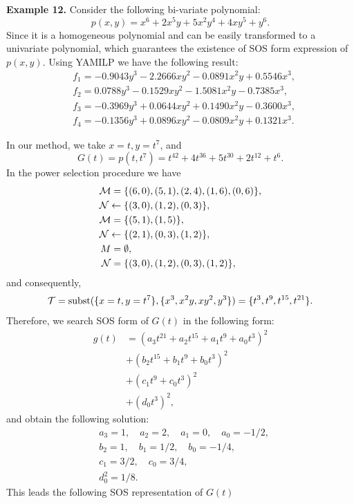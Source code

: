 \documentclass[runningheads]{llncs}
\begin{document}
{{\bf Example 12.} Consider the following bi-variate polynomial: 
$$
p(x,y)=x^6+2x^5y+5x^2y^4+4xy^5+y^6.
$$
Since it is a homogeneous polynomial  and can be easily transformed to a univariate polynomial, which guarantees the existence of SOS form expression of $p(x,y)$. Using YAMILP we have the following result: \begin{align*}
&f_1 = -0.9043  y^3 - 2.2666  x  y^2 - 0.0891  x^2  y + 0.5546  x^3,\\
&f_2 = 0.0788  y^3 - 0.1529  x  y^2 - 1.5081  x^2  y - 0.7385  x^3,\\
&f_3 = -0.3969  y^3 + 0.0644  x  y^2 + 0.1490  x^2  y - 0.3600  x^3,\\
&f_4 = -0.1356  y^3 + 0.0896  x  y^2 - 0.0809  x^2  y + 0.1321  x^3.
\end{align*}

In our method, we take $x=t,y=t^7$, and 
$$
G(t)=p(t,t^7)=
t^{42}+4t^{36}+5t^{30}+2t^{12}+t^6.
$$
In the power selection procedure we have
\begin{align*}
    {\cal M}=&\;\{(6,0),(5,1),(2,4),(1,6),(0,6)\},\\
    {\cal N}\leftarrow &\;\{(3,0),(1,2),(0,3)\},\\
    {\cal M}=&\;\{(5,1),(1,5)\},\\
    {\cal N}\leftarrow&\; \{(2,1),(0,3),(1,2)\},\\
    M=&\;\emptyset,\\
    {\cal N}=&\;\{(3,0),(1,2),(0,3),(1,2)\},
\end{align*}
and consequently,
$$
{\cal T}=\text{subst}(\{x=t,y=t^7\}, \{x^3,x^2y,xy^2,y^3\})
=\{t^3,t^9,t^{15},t^{21}\}.
$$
Therefore, we search SOS form of $G(t)$ in the following form:
\begin{align*}
g(t)&=(a_3t^{21}+a_2t^{15}+a_1t^9+a_0t^3)^2\\
&+(b_2t^{15}+b_1t^9+b_0t^3)^2\\
&+(c_1t^9+c_0t^3)^2\\
&+(d_0t^3)^2,
\end{align*}
and obtain the following solution:
\begin{align*}
&a_3=1,\quad a_2=2, \quad a_1=0, \quad a_0=-1/2,\\
&b_2=1,\quad b_1=1/2, \quad b_0=-1/4,\\
&c_1=3/2,\quad c_0=3/4,\\
&d_0^2=1/8.
\end{align*}
This leads the following SOS representation of $G(t)$
}
\end{document}
